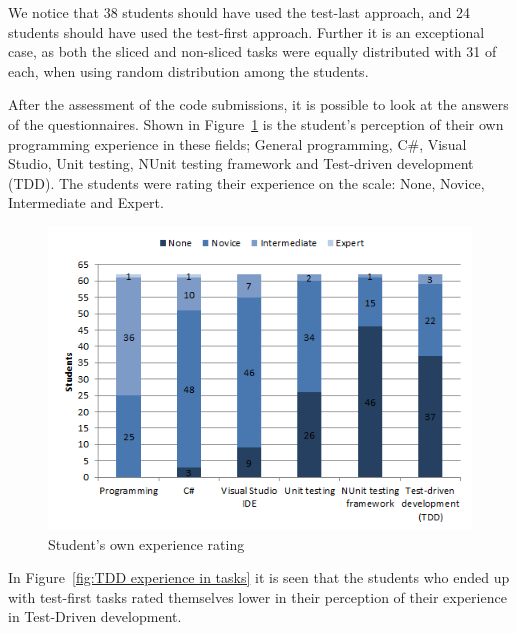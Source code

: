 \documentclass{sig-alternate-05-2015}
\begin{document}
We notice that 38 students should have used the test-last approach, and 24 students should have used the test-first approach. Further it is an exceptional case, as both the sliced and non-sliced tasks were equally distributed with 31 of each, when using random distribution among the students.

After the assessment of the code submissions, it is possible to look at the answers of the questionnaires. Shown in Figure~\ref{fig:Student's own experience rating} is the student's perception of their own programming experience in these fields; General programming, C{\#}, Visual Studio, Unit testing, NUnit testing framework and Test-driven development (TDD).
The students were rating their experience on the scale: None, Novice, Intermediate and Expert.

\begin{figure}[!ht]
	\centering
	\includegraphics[width=1\linewidth]{img03}
	\caption{Student's own experience rating}
	\label{fig:Student's own experience rating}
\end{figure}

In Figure~\ref{fig:TDD experience in tasks} it is seen that the students who ended up with test-first tasks rated themselves lower in their perception of their experience in Test-Driven development.
\end{document}
